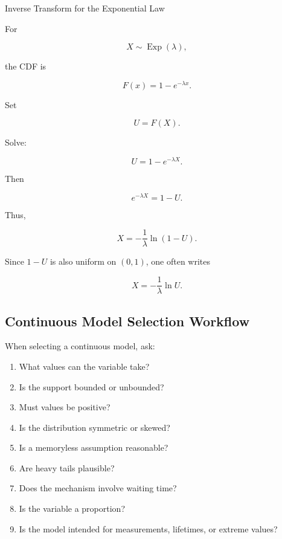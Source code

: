 \begin{workedexamplebox}{Inverse Transform for the Exponential Law}

For

\[
X\sim\operatorname{Exp}(\lambda),
\]

the CDF is

\[
F(x)=1-e^{-\lambda x}.
\]

Set

\[
U=F(X).
\]

Solve:

\[
U
=
1-e^{-\lambda X}.
\]

Then

\[
e^{-\lambda X}=1-U.
\]

Thus,

\[
X
=
-\frac1\lambda
\ln(1-U).
\]

Since \(1-U\) is also uniform on \((0,1)\), one often writes

\begin{answerbox}
\[
\boxed{
X
=
-\frac1\lambda
\ln U.
}
\]
\end{answerbox}

\end{workedexamplebox}

\subsection{Continuous Model Selection Workflow}
\label{subsec:continuous-model-selection-workflow}

When selecting a continuous model, ask:

\begin{enumerate}
    \item What values can the variable take?
    \item Is the support bounded or unbounded?
    \item Must values be positive?
    \item Is the distribution symmetric or skewed?
    \item Is a memoryless assumption reasonable?
    \item Are heavy tails plausible?
    \item Does the mechanism involve waiting time?
    \item Is the variable a proportion?
    \item Is the model intended for measurements, lifetimes, or extreme
          values?
\end{enumerate}

